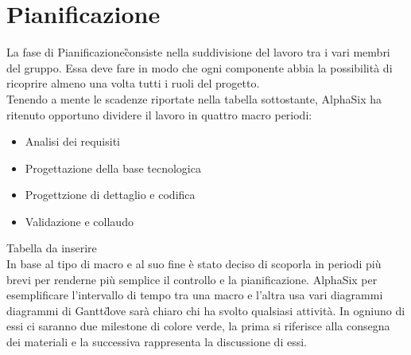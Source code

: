 \newpage
\section{Pianificazione}\label{Pianificazione}
    La fase di Pianificazione\G consiste nella suddivisione del lavoro tra i vari membri del gruppo. Essa deve fare in modo che ogni componente abbia la possibilità di ricoprire almeno una volta tutti i ruoli del progetto.\\
    Tenendo a mente le scadenze riportate nella tabella sottostante,
     AlphaSix ha ritenuto opportuno dividere il lavoro in quattro
     macro periodi:
     \begin{itemize}
		\item Analisi dei requisiti
		\item Progettazione della base tecnologica
		\item Progettzione di dettaglio e codifica
		\item Validazione e collaudo
     \end{itemize}
    
    Tabella da inserire\\
    
    In base al tipo di macro e al suo fine è stato deciso di scoporla in periodi più brevi per renderne più semplice il
    controllo e la pianificazione. AlphaSix per esemplificare l'intervallo di tempo tra una macro e l'altra usa vari diagrammi
    diagrammi di Gantt\G dove sarà chiaro chi ha svolto qualsiasi attività. In ogniuno di essi ci saranno due
    milestone di colore verde, la prima si riferisce alla consegna dei materiali e la successiva rappresenta la discussione di essi.

